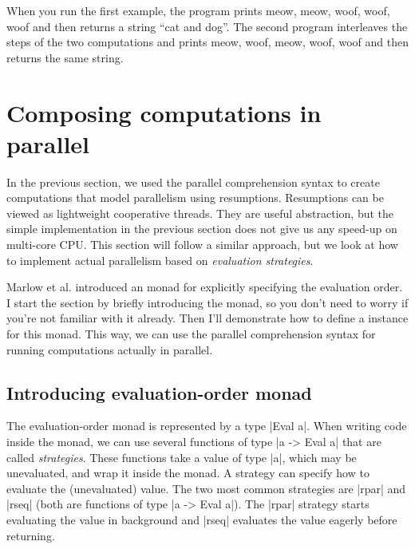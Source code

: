 \documentclass{tmr}
\begin{document}
When you run the first example, the program prints meow, meow, woof, woof, woof and then returns 
a string ``cat and dog''. The second program interleaves the steps of the two computations and 
prints meow, woof, meow, woof, woof and then returns the same string.	


\section{Composing computations in parallel}

In the previous section, we used the parallel comprehension syntax to create computations that 
model parallelism using resumptions. Resumptions can be viewed as lightweight cooperative threads.
They are useful abstraction, but the simple implementation in the previous section does not give
us any speed-up on multi-core CPU. This section will follow a similar approach, but we look at how 
to implement actual parallelism based on \textit{evaluation strategies}. 

Marlow et al. \cite{strategies-new} introduced an  monad for explicitly 
specifying the evaluation order. I start the section by briefly introducing the monad, so you don't 
need to worry if you're not familiar with it already. Then I'll demonstrate how to define a 
 instance for this monad. This way, we can use the parallel 
comprehension syntax for running computations actually in parallel.


\subsection{Introducing evaluation-order monad}

The evaluation-order monad is represented by a type |Eval a|. When writing code inside the monad,
we can use several functions of type |a -> Eval a| that are called \textit{strategies}. These
functions take a value of type |a|, which may be unevaluated, and wrap it inside the monad.
A strategy can specify how to evaluate the (unevaluated) value. The two most common strategies
are |rpar| and |rseq| (both are functions of type |a -> Eval a|). The |rpar| strategy starts 
evaluating the value in background and |rseq| evaluates the value eagerly before returning. 
\end{document}
